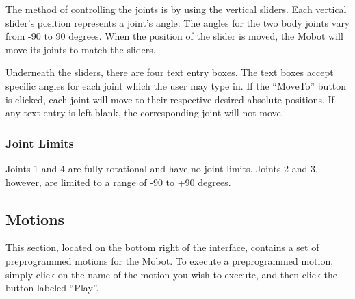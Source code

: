 \documentclass{article}
\begin{document}
The method of controlling the joints is by using the vertical sliders.
Each vertical slider's position represents a joint's angle. 
 The angles for the two body joints vary from -90 to 90 degrees. When
the position of the slider is moved, the Mobot will move its joints to match the 
sliders. 

Underneath the sliders, there are four text entry boxes. The text boxes
accept specific angles for each joint which the user may type in. If 
the ``MoveTo'' button is clicked, each joint will move to their respective 
desired absolute positions. If any text entry is left blank, the corresponding joint will
not move. 

\subsubsection{Joint Limits}
Joints 1 and 4 are fully rotational and have no joint limits. Joints 2 and 3, however, are 
limited to a range of -90 to +90 degrees.

\subsection{Motions}
This section, located on the bottom right of the interface, contains a set of
preprogrammed motions for the Mobot. To execute a preprogrammed motion, simply
click on the name of the motion you wish to execute, and then click the button
labeled ``Play''.
\end{document}

